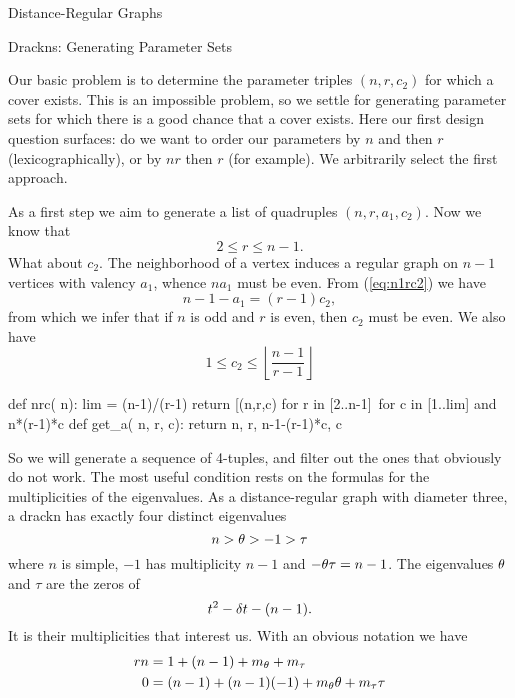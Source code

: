 \begin{chap}{Distance-Regular Graphs}
\begin{sect}{Drackns: Generating Parameter Sets}
\begin{para}
\end{para}
%
\begin{para}
Our basic problem is to determine the parameter triples $(n,r,c_2)$
for which a cover exists. This is an impossible problem, so we settle
for generating parameter sets for which there is a good chance that a
cover exists. Here our first design question surfaces: do we want to order
our parameters by $n$ and then $r$ (lexicographically), or by $nr$ then $r$
(for example). We arbitrarily select the first approach.
\end{para}
%
\begin{para}
As a first step we aim to generate a list of quadruples $(n,r,a_1,c_2)$.
Now we know that
\begin{equation}
\label{eq:rbnd}
    2\le r\le n-1.
\end{equation}
What about $c_2$. The neighborhood of a vertex induces a regular graph
on $n-1$ vertices with valency $a_1$, whence $na_1$ must be even.
From (\ref{eq:n1rc2}) we have 
\[
    n-1-a_1 = (r-1)c_2,
\]
from which we infer that if $n$ is odd and $r$ is even, then $c_2$ must be
even. We also have
\begin{equation}
\label{c2bnd}
    1\le c_2 \le \left\lfloor\frac{n-1}{r-1}\right\rfloor
\end{equation}
\end{para}
%
\begin{sagecode}
\begin{sageinput}
    def nrc( n):
        lim = (n-1)/(r-1)
        return [(n,r,c) for r in [2..n-1]\ 
         for c in [1..lim] and n*(r-1)*c %
    def get_a( n, r, c):
        return n, r, n-1-(r-1)*c, c
\end{sageinput}
\end{sagecode}
%
\begin{para}
So we will generate a sequence of 4-tuples, and filter out the ones
that obviously do not work. The most useful condition rests on the formulas
for the multiplicities of the eigenvalues. As a distance-regular graph
with diameter three, a drackn has exactly four distinct eigenvalues
\[
    n > \theta > -1 > \tau
\]
where $n$ is simple, $-1$ has multiplicity $n-1$ and $-\theta\tau=n-1$.
The eigenvalues $\theta$ and $\tau$ are the zeros of
\[
    t^2 -\delta t - (n-1).
\]
It is their multiplicities that interest us. With an obvious notation we have
\begin{align*}
    rn &= 1 + (n-1) +m_\theta+m_\tau\\
    0  &= (n-1) +(n-1)(-1) +m_\theta\theta+m_\tau\tau
\end{align*}

\end{para}
\end{sect}
\end{chap}
